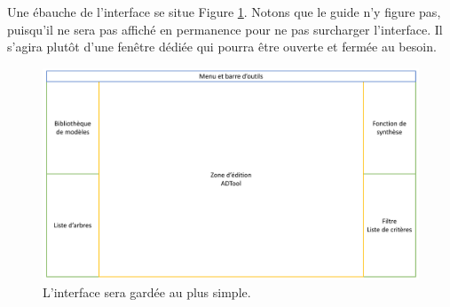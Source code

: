        Une ébauche de l'interface se situe Figure \ref{fig:interface}. Notons que le guide n'y figure pas, puisqu'il ne sera pas affiché en permanence pour ne pas surcharger l'interface. Il s'agira plutôt d'une fenêtre dédiée qui pourra être ouverte et fermée au besoin.

        \begin{figure}
            \begin{center}
                \includegraphics[width=1\textwidth]{figure/interface.pdf}
            \end{center}
            \caption{L'interface sera gardée au plus simple.}
            \label{fig:interface}
        \end{figure}